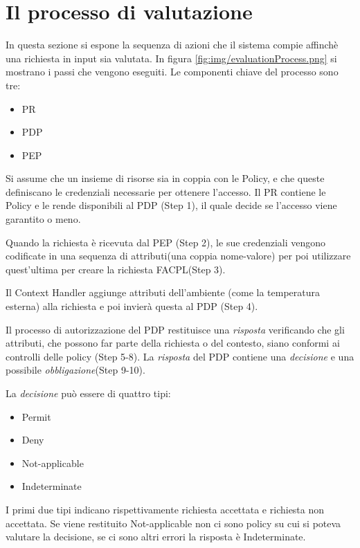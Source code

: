 \section{Il processo di valutazione}
\label{sec:Il processo di valutazione Facpl}
In questa sezione si espone la sequenza di azioni che il sistema compie affinchè una richiesta in input sia valutata.
In figura \ref{fig:img/evaluationProcess.png} si mostrano i passi che vengono eseguiti.
Le componenti chiave del processo sono tre:
\begin{itemize}
  \renewcommand\labelitemi{--}
  \item \ac{PR}
  \item \ac{PDP}
  \item \ac{PEP}
\end{itemize}
Si assume che un insieme di risorse sia in coppia con le Policy, e che queste definiscano le credenziali
necessarie per ottenere l'accesso. Il \ac{PR} contiene le Policy e le rende disponibili al \ac{PDP} (Step 1), il
quale decide se l'accesso viene garantito o meno. \par
Quando la richiesta è ricevuta dal \ac{PEP} (Step 2), le sue credenziali vengono codificate in una sequenza
di attributi(una coppia nome-valore) per poi utilizzare quest'ultima per creare la richiesta \ac{FACPL}(Step 3).\par
Il Context Handler aggiunge attributi dell'ambiente (come la temperatura esterna) alla richiesta e
poi invierà questa al \ac{PDP} (Step 4).\par
Il processo di autorizzazione del \ac{PDP} restituisce una \emph{risposta} verificando che gli attributi, che possono far
parte della richiesta o del contesto, siano conformi ai controlli delle policy (Step 5-8). La \emph{risposta} del \ac{PDP}
contiene una \emph{decisione} e una possibile \emph{obbligazione}(Step 9-10).\par
La \emph{decisione} può essere di quattro tipi:
\begin{itemize}
  \renewcommand\labelitemi{--}
  \item Permit
  \item Deny
  \item Not-applicable
  \item Indeterminate
\end{itemize}
I primi due tipi indicano rispettivamente richiesta accettata e richiesta non accettata. Se viene restituito Not-applicable
non ci sono policy su cui si poteva valutare la decisione, se ci sono altri errori la risposta è Indeterminate.
